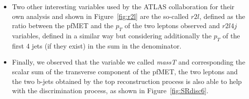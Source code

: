 \documentclass[a4paper, 10pt, openright]{report}
\begin{document}
\begin{itemize}
\item Two other interesting variables used by the \ac{ATLAS} collaboration for their own analysis and shown in Figure~\ref{fig:r2l} are the so-called $r2l$, defined as the ratio between the pf\ac{MET} and the $p_T$ of the two leptons observed and $r2l4j$ variables, defined in a similar way but considering additionally the $p_T$ of the first 4 jets (if they exist) in the sum in the denominator.
\item Finally, we observed that the variable we called \textit{massT} and corresponding the scalar sum of the transverse component of the pf\ac{MET}, the two leptons and the two b-jets obtained by the top reconstruction process is also able to help with the discrimination process, as shown in Figure~\ref{fig:SRdisc6}.

\begin{figure}[htbp]
\centering
{}


\end{figure}
\end{itemize}
\end{document}
